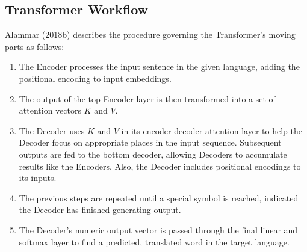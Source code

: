 \subsection{Transformer Workflow}

Alammar (2018b) describes the procedure governing the Transformer's moving parts as follows: 

\begin{enumerate}
    \item The Encoder processes the input sentence in the given language, adding the positional encoding to input embeddings.
    
    \item The output of the top Encoder layer is then transformed into a set of attention vectors $K$ and $V$.
    
    \item The Decoder uses $K$ and $V$ in its encoder-decoder attention layer to help the Decoder focus on appropriate places in the input sequence. Subsequent outputs are fed to the bottom decoder, allowing Decoders to accumulate results like the Encoders. Also, the Decoder includes positional encodings to its inputs. 
    
    \item The previous steps are repeated until a special symbol is reached, indicated the Decoder has finished generating output.
    
    \item The Decoder's numeric output vector is passed through the final linear and softmax layer to find a predicted, translated word in the target language. 
    
\end{enumerate}

